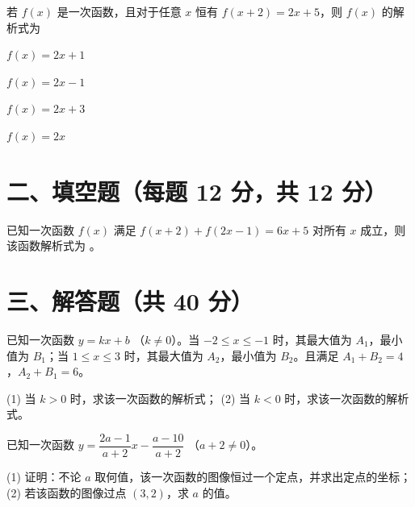 \documentclass{exam-zh}
\newcommand{\answerarea}[1][40mm]{%
  \vspace{2mm}%
  \begin{tcolorbox}[
    enhanced, breakable,
    colback=white,
    colframe=white,
    boxrule=0pt,
    height=#1,
    valign=top,
    bottom=0mm,
    after skip=0mm,
  ]
  \end{tcolorbox}%
}
\begin{document}
\begin{question}[points=12]
  若 $f(x)$ 是一次函数，且对于任意 $x$ 恒有 $f(x+2) = 2x + 5$，则 $f(x)$ 的解析式为
  \begin{choices}
    \item $f(x) = 2x + 1$
    \item $f(x) = 2x - 1$
    \item $f(x) = 2x + 3$
    \item $f(x) = 2x$
  \end{choices}
\end{question}


\section*{二、填空题（每题 12 分，共 12 分）}


\begin{question}[points=12]
  已知一次函数 $f(x)$ 满足 $f(x+2) + f(2x-1) = 6x + 5$ 对所有 $x$ 成立，则该函数解析式为 \fillin。
\end{question}


\section*{三、解答题（共 40 分）}


\begin{problem}[points=20]
  已知一次函数 $y = kx + b$ （$k \neq 0$）。当 $-2 \leq x \leq -1$ 时，其最大值为 $A_1$，最小值为 $B_1$；当 $1 \leq x \leq 3$ 时，其最大值为 $A_2$，最小值为 $B_2$。且满足 $A_1 + B_2 = 4$，$A_2 + B_1 = 6$。

(1) 当 $k > 0$ 时，求该一次函数的解析式；
(2) 当 $k < 0$ 时，求该一次函数的解析式。
  \answerarea[60mm]
\end{problem}



\begin{problem}[points=20]
  已知一次函数 $y = \dfrac{2a - 1}{a + 2}x - \dfrac{a - 10}{a + 2}$ （$a + 2 \neq 0$）。

(1) 证明：不论 $a$ 取何值，该一次函数的图像恒过一个定点，并求出定点的坐标；
(2) 若该函数的图像过点 $(3, 2)$，求 $a$ 的值。
  \answerarea[60mm]
\end{problem}
\end{document}
